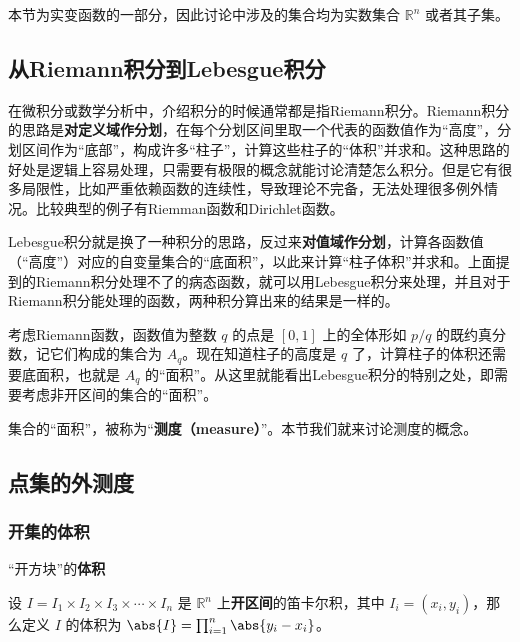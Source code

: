 


本节为实变函数的一部分，因此讨论中涉及的集合均为实数集合 $\mathbb{R}^n$ 或者其子集。


\subsection{从Riemann积分到Lebesgue积分}


在微积分或数学分析中，介绍积分的时候通常都是指Riemann积分。Riemann积分的思路是\textbf{对定义域作分划}，在每个分划区间里取一个代表的函数值作为“高度”，分划区间作为“底部”，构成许多“柱子”，计算这些柱子的“体积”并求和。这种思路的好处是逻辑上容易处理，只需要有极限的概念就能讨论清楚怎么积分。但是它有很多局限性，比如严重依赖函数的连续性，导致理论不完备，无法处理很多例外情况。比较典型的例子有Riemman函数和Dirichlet函数。

Lebesgue积分就是换了一种积分的思路，反过来\textbf{对值域作分划}，计算各函数值（“高度”）对应的自变量集合的“底面积”，以此来计算“柱子体积”并求和。上面提到的Riemann积分处理不了的病态函数，就可以用Lebesgue积分来处理，并且对于Riemann积分能处理的函数，两种积分算出来的结果是一样的。

考虑Riemann函数，函数值为整数 $q$ 的点是 $[0, 1]$ 上的全体形如 $p/q$ 的既约真分数，记它们构成的集合为 $A_q$。现在知道柱子的高度是 $q$ 了，计算柱子的体积还需要底面积，也就是 $A_q$ 的“面积”。从这里就能看出Lebesgue积分的特别之处，即需要考虑非开区间的集合的“面积”。

集合的“面积”，被称为“\textbf{测度（measure）}”。本节我们就来讨论测度的概念。



\subsection{点集的外测度}

\subsubsection{开集的体积}

\begin{definition}{“开方块”的\textbf{体积}}\label{def_SetMet_1}

设 $I=I_1\times I_2\times I_3\times\cdots\times I_n$ 是 $\mathbb{R}^n$ 上\textbf{开区间}的笛卡尔积，其中 $I_i=(x_i, y_i)$，那么定义 $I$ 的体积为 $\abs{I} = \prod_{i=1}^n \abs{y_i-x_i}$。

\end{definition}

